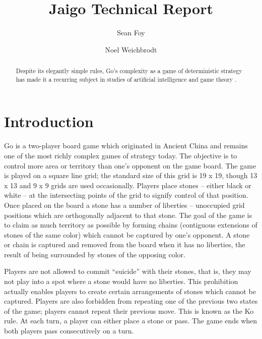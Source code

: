 \documentclass{memoir}
\title{Jaigo Technical Report}
\author{Sean Foy \and Noel Weichbrodt}
\begin{document}
	
\newtheorem{defn}{Definition}

\begin{titlingpage}
\maketitle

\begin{abstract}
Despite its elegantly simple rules, Go's complexity as a game of deterministic strategy has made it a recurring subject in studies of artificial intelligence and game theory \cite{Muller2002}.
\end{abstract}
\end{titlingpage}

\tableofcontents
\listoftables

\chapter{Introduction}
Go is a two-player board game which originated in Ancient China and remains one of the most richly complex games of strategy today. The objective is to control more area or territory than one's opponent on the game board. The game is played on a square line grid; the standard size of this grid is 19 x 19, though 13 x 13 and 9 x 9 grids are used occasionally. Players place stones -- either black or white -- at the intersecting points of the grid to signify control of that position. Once placed on the board a stone has a number of liberties -- unoccupied grid positions which are orthogonally adjacent to that stone. The goal of the game is to claim as much territory as possible by forming chains (contiguous extensions of stones of the same color) which cannot be captured by one's opponent. A stone or chain is captured and removed from the board when it has no liberties, the result of being surrounded by stones of the opposing color.

Players are not allowed to commit ``suicide'' with their stones, that is, they may not play into a spot where a stone would have no liberties. This prohibition actually enables players to create certain arrangements of stones which cannot be captured. Players are also forbidden from repeating one of the previous two states of the game; players cannot repeat their previous move. This is known as the Ko rule. At each turn, a player can either place a stone or pass. The game ends when both players pass consecutively on a turn.
\end{document}
